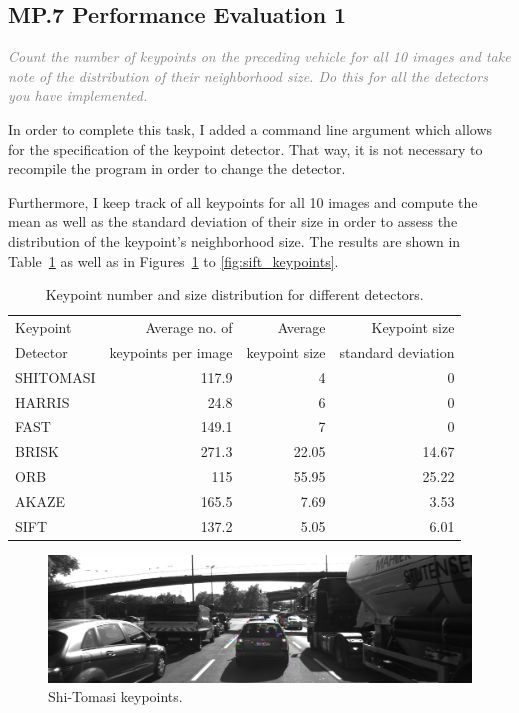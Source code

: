 \documentclass[a4paper]{scrartcl}
\begin{document}
\subsection*{MP.7 Performance Evaluation 1}
\textcolor{gray}{\textit{Count the number of keypoints on the preceding vehicle for all 10 images and take note of the distribution of their neighborhood size. Do this for all the detectors you have implemented.}}

In order to complete this task, I added a command line argument which allows for the
specification of the keypoint detector. That way, it is not necessary to recompile the program
in order to change the detector.

Furthermore, I keep track of all keypoints for all 10 images and compute the mean as well
as the standard deviation of their size in order to assess the distribution of the
keypoint's neighborhood size. The results are shown in Table~\ref{tab:performance_1}
as well as in Figures~\ref{fig:shi_tomasi_keypoints} to \ref{fig:sift_keypoints}.

\begin{table}
	\caption{Keypoint number and size distribution for different detectors.}
	\label{tab:performance_1}
	\begin{tabular}{l||r|r|r}
		Keypoint & Average no. of  		& Average  		& Keypoint size	\\
		Detector & keypoints per image 	& keypoint size 	& standard deviation 	\\
		\hline \hline
		SHITOMASI & 117.9 & 4 & 0 \\
		HARRIS & 24.8 & 6 & 0 \\
		FAST & 149.1 & 7 & 0 \\
		BRISK & 271.3 & 22.05 & 14.67 \\
		ORB & 115 & 55.95 & 25.22 \\
		AKAZE & 165.5 & 7.69 & 3.53 \\
		SIFT & 137.2 & 5.05 & 6.01 \\
		\hline
	\end{tabular}
\end{table}

\begin{figure}
	\centering
	\includegraphics[width=0.8\columnwidth]{./keypoints/SHITOMASI}
	\caption{Shi-Tomasi keypoints.}
	\label{fig:shi_tomasi_keypoints}
\end{figure}
\end{document}
